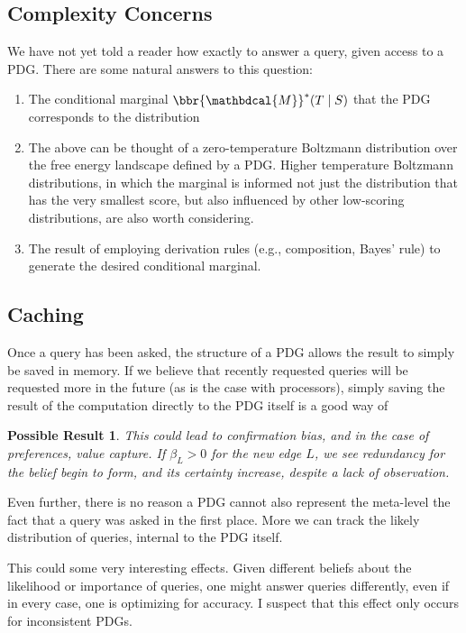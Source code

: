 \documentclass{article}
\theoremstyle{plain}
\newtheorem{poss}{Possible Result}
\theoremstyle{definition}
\theoremstyle{remark}
\newcommand{\dg}[1]{\mathbdcal{#1}}
\begin{document}
	
	\subsection{Complexity Concerns}
	
	We have not yet told a reader how exactly to answer a query, given access to a PDG. There are some natural answers to this question:
	\begin{enumerate}
		\item The conditional marginal $\bbr{\dg M}^*(T \mid S)$ that the PDG corresponds to the distribution
		\item The above can be thought of a zero-temperature Boltzmann distribution over the free energy landscape defined by a PDG. Higher temperature Boltzmann distributions, in which the marginal is informed not just the distribution that has the very smallest score, but also influenced by other low-scoring distributions, are also worth considering.
		\item The result of employing derivation rules (e.g., composition, Bayes' rule) to generate the desired conditional marginal.
	\end{enumerate}
	
	\subsection{Caching}
	Once a query has been asked, the structure of a PDG allows the result to simply be saved in memory. If we believe that recently requested queries will be requested more in the future (as is the case with processors), simply saving the result of the computation directly to the PDG itself is a good way of 
	
	\medskip
	\begin{poss}
		This could lead to confirmation bias, and in the case of preferences, value capture. If $\beta_L > 0$ for the new edge $L$, we see redundancy for the belief begin to form, and its certainty increase, despite a lack of observation. 
	\end{poss}

	
	
	Even further, there is no reason a PDG cannot also represent the meta-level the fact that a query was asked in the first place. More we can track the likely distribution of queries, internal to the PDG itself. 
	
	This could some very interesting effects. Given different beliefs about the likelihood or importance of queries, one might answer queries differently, even if in every case, one is optimizing for accuracy. I suspect that this effect only occurs for inconsistent PDGs.
	
\end{document}

